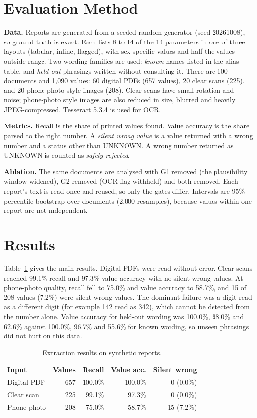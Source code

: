 \documentclass[10pt,twocolumn]{article}
\begin{document}
\section{Evaluation Method}
\textbf{Data.} Reports are generated from a seeded random generator (seed 20261008), so ground truth is exact. Each lists 8 to 14 of the 14 parameters in one of three layouts (tabular, inline, flagged), with sex-specific values and half the values outside range. Two wording families are used: \emph{known} names listed in the alias table, and \emph{held-out} phrasings written without consulting it. There are 100 documents and 1,090 values: 60 digital PDFs (657 values), 20 clear scans (225), and 20 phone-photo style images (208). Clear scans have small rotation and noise; phone-photo style images are also reduced in size, blurred and heavily JPEG-compressed. Tesseract 5.3.4 is used for OCR.

\textbf{Metrics.} Recall is the share of printed values found. Value accuracy is the share parsed to the right number. A \emph{silent wrong value} is a value returned with a wrong number and a status other than UNKNOWN. A wrong number returned as UNKNOWN is counted as \emph{safely rejected}.

\textbf{Ablation.} The same documents are analysed with G1 removed (the plausibility window widened), G2 removed (OCR flag withheld) and both removed. Each report's text is read once and reused, so only the gates differ. Intervals are 95\% percentile bootstrap over documents (2,000 resamples), because values within one report are not independent.

\section{Results}
Table~\ref{tab:main} gives the main results. Digital PDFs were read without error. Clear scans reached 99.1\% recall and 97.3\% value accuracy with no silent wrong values. At phone-photo quality, recall fell to 75.0\% and value accuracy to 58.7\%, and 15 of 208 values (7.2\%) were silent wrong values. The dominant failure was a digit read as a different digit (for example 142 read as 342), which cannot be detected from the number alone. Value accuracy for held-out wording was 100.0\%, 98.0\% and 62.6\% against 100.0\%, 96.7\% and 55.6\% for known wording, so unseen phrasings did not hurt on this data.

\begin{table}[t]
\centering\small
\caption{Extraction results on synthetic reports.}\label{tab:main}
\begin{tabular}{@{}lrrrr@{}}
\toprule
Input & Values & Recall & Value acc. & Silent wrong\\
\midrule
Digital PDF & 657 & 100.0\% & 100.0\% & 0 (0.0\%)\\
Clear scan & 225 & 99.1\% & 97.3\% & 0 (0.0\%)\\
Phone photo & 208 & 75.0\% & 58.7\% & 15 (7.2\%)\\
\bottomrule
\end{tabular}
\end{table}
\end{document}
